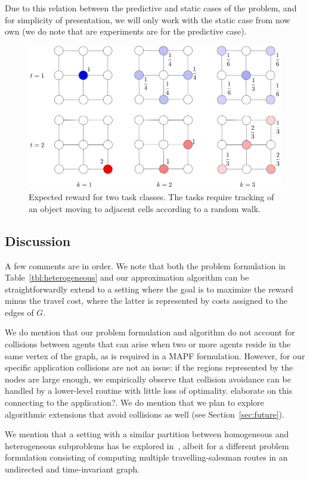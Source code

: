 \documentclass[conference]{IEEEtran}
\newcommand{\frmargin}[2]{{\color{brown}#1}\marginpar{\color{brown}\raggedright\footnotesize [FR]:#2}}
\newcommand{\todo}[1]{{\color{red}{\bf TODO:} #1}}
\newcommand{\frmargin}[2]{#1}
\newcommand{\todo}[1]{}
\begin{document}
Due to this relation between the predictive and static cases of the problem, and for simplicity of presentation, we will only work with the static case from now own (\frmargin{we do note that are experiments are for the predictive case}{Dubious grammar}). 

\begin{figure}[h]
\centering
\includegraphics[width=.35\textwidth]{fig/distribution_and_reward.pdf}
\caption{Expected reward for two task classes. The tasks require tracking of an object moving to adjacent cells according to a random walk.}
\label{fig:distribution_and_reward}
\end{figure}

\subsection{Discussion}
A few comments are in order. We note that both the problem formulation in Table~\ref{tbl:heterogeneous} and our approximation algorithm can be straightforwardly extend to a setting where the goal is to maximize the reward minus the travel cost, where the latter is represented by costs assigned to the edges of $G$. 

We do mention that our problem formulation and algorithm do not account for collisions between agents that can arise when two or more agents reside in the same vertex of the graph, as is required in a MAPF formulation. However, for our specific application collisions are not an issue: \frmargin{if the regions represented by the nodes are large enough, we empirically observe that collision avoidance can be handled by a lower-level routine with little loss of optimality.}{Added} \todo{elaborate on this connecting to the application}?. We do mention that we plan to explore algorithmic extensions that avoid collisions as well (see Section~\ref{sec:future}).

We mention that a setting with a similar partition between homogeneous and heterogeneous subproblems has be explored in~\cite{PrasadETAL20}, albeit for a different problem formulation consisting of computing multiple travelling-salesman routes in an undirected and time-invariant graph. %
\end{document}
